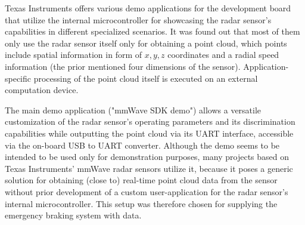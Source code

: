 \FloatBarrier\noindent
Texas Instruments offers various demo applications for the development board that utilize the internal microcontroller for showcasing the radar sensor's capabilities in different specialized scenarios.
It was found out that most of them only use the radar sensor itself only for obtaining a point cloud, which points include spatial information in form of $x,y,z$ coordinates and a radial speed information (the prior mentioned four dimensions of the sensor).
Application-specific processing of the point cloud itself is executed on an external computation device.
\par
The main demo application ("mmWave SDK demo") allows a versatile customization of the radar sensor's operating parameters and its discrimination capabilities while outputting the point cloud via its UART interface, accessible via the on-board USB to UART converter.
Although the demo seems to be intended to be used only for demonstration purposes, many projects based on Texas Instruments' mmWave radar sensors utilize it, because it poses a generic solution for obtaining (close to) real-time point cloud data from the sensor without prior development of a custom user-application for the radar sensor's internal microcontroller.
This setup was therefore chosen for supplying the emergency braking system with data.

\subsection{}

